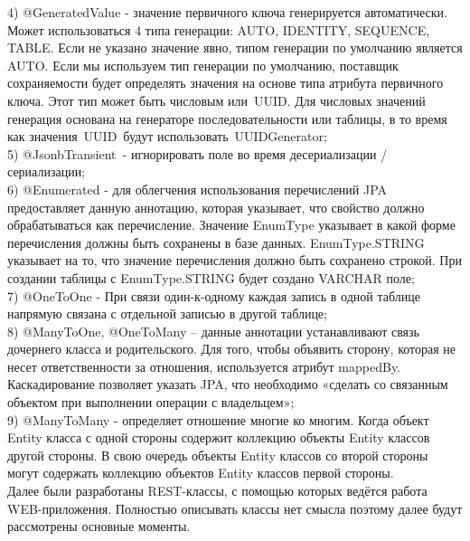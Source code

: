 \documentclass[a4paper]{article}
\begin{document}
\normalsize{4)	@GeneratedValue - значение первичного ключа генерируется автоматически. Может использоваться 4 типа генерации: AUTO, IDENTITY, SEQUENCE, TABLE. Если не указано значение явно, типом генерации по умолчанию является AUTO. Если мы используем тип генерации по умолчанию, поставщик сохраняемости будет определять значения на основе типа атрибута первичного ключа. Этот тип может быть числовым или UUID. Для числовых значений генерация основана на генераторе последовательности или таблицы, в то время как значения UUID будут использовать UUIDGenerator;}\\


\normalsize{5)	@JsonbTransient - игнорировать поле во время десериализации / сериализации;}\\


\normalsize{6)	@Enumerated - для облегчения использования перечислений JPA предоставляет данную аннотацию, которая указывает, что свойство должно обрабатываться как перечисление. Значение EnumType указывает в какой форме перечисления должны быть сохранены в базе данных. EnumType.STRING указывает на то, что значение перечисления должно быть сохранено строкой. При создании таблицы с EnumType.STRING будет создано VARCHAR поле;}\\


\normalsize {7)	@OneToOne - При связи один-к-одному каждая запись в одной таблице напрямую связана с отдельной записью в другой таблице;}\\


\normalsize{8)	@ManyToOne, @OneToMany – данные аннотации устанавливают связь дочернего класса и родительского. Для того, чтобы объявить сторону, которая не несет ответственности за отношения, используется атрибут mappedBy. Каскадирование позволяет указать JPA, что необходимо «сделать со связанным объектом при выполнении операции с владельцем»;}\\


\normalsize {9)	@ManyToMany - определяет отношение многие ко многим. Когда объект Entity класса с одной стороны содержит коллекцию объекты Entity классов другой стороны. В свою очередь объекты Entity классов со второй стороны могут содержать коллекцию объектов Entity классов первой стороны.}\\


\normalsize {Далее были разработаны REST-классы, с помощью которых ведётся работа WEB-приложения. Полностью описывать классы нет смысла поэтому далее будут рассмотрены основные моменты. 
}\\
\end{document}
